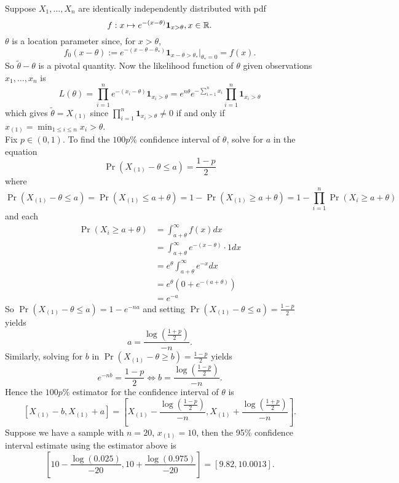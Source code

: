 \documentclass[11pt,fleqn]{book} %
\begin{document}
\begin{example} \label{5711}
Suppose \(X_1, \ldots, X_n\) are identically independently distributed with pdf
\[
f: x\mapsto e^{-(x - \theta)}\mathbf{1}_{x > \theta}, x \in \mathbb{R}.
\]
\indent \(\theta\) is a location parameter since, for \(x > \theta\),
\[
f_0(x - \theta) := e^{-(x - \theta - \theta_*)}\mathbf{1}_{x - \theta > \theta_*}|_{\theta_* = 0} = f(x).
\]
\indent So \(\tilde{\theta} - \theta\) is a pivotal quantity. Now the likelihood function of \(\theta\) given observations \(x_1, \ldots, x_n\) is
\[
L(\theta) = \prod_{i=1}^n e^{-(x_i - \theta)} \mathbf{1}_{x_i > \theta} = e^{n\theta} e^{-\sum_{i=1}^n x_i} \prod_{i=1}^n \mathbf{1}_{x_i > \theta}
\]
which gives \(\tilde{\theta} = X_{(1)}\) since \(\prod_{i=1}^n \mathbf{1}_{x_i > \theta} \neq 0\) if and only if \(x_{(1)} = \min_{1 \leq i \leq n}x_i > \theta\). \\
\indent Fix \(p \in (0, 1)\). To find the \(100p\%\) confidence interval of \(\theta\), solve for \(a\) in the equation
\[
\Pr(X_{(1)} - \theta \leq a) = \frac{1 - p}{2}
\]
where
\[
\Pr(X_{(1)} - \theta \leq a) = \Pr(X_{(1)} \leq a + \theta) = 1 - \Pr(X_{(1)} \geq a + \theta) = 1 - \prod_{i=1}^n \Pr(X_i \geq a + \theta)
\]
and each
\[
\begin{aligned}
\Pr(X_i \geq a + \theta) &= \int_{a + \theta}^\infty f(x)dx \\
&= \int_{a + \theta}^\infty e^{-(x - \theta)}\cdot1 dx \\
&= e^\theta \int_{a + \theta}^\infty e^{-x}dx \\
&= e^\theta(0 + e^{-(a + \theta)}) \\
&= e^{-a}
\end{aligned}
\]
\indent So \(\Pr(X_{(1)} - \theta \leq a) = 1 - e^{-na}\) and setting \(\Pr(X_{(1)} - \theta \leq a) = \frac{1 - p}{2}\) yields
\[
a = \frac{\log\left(\frac{1 + p}{2}\right)}{-n}.
\]
\indent Similarly, solving for \(b\) in \(\Pr(X_{(1)} - \theta \geq b) = \frac{1 - p}{2}\) yields
\[
e^{-nb} = \frac{1 - p}{2} \Leftrightarrow b = \frac{\log\left(\frac{1 - p}{2}\right)}{-n}.
\]
\indent Hence the \(100p\%\) estimator for the confidence interval of \(\theta\) is
\[
\left[X_{(1)} - b, X_{(1)} + a\right] = \left[X_{(1)} - \frac{\log\left(\frac{1 - p}{2}\right)}{-n}, X_{(1)} + \frac{\log\left(\frac{1 + p}{2}\right)}{-n}\right].
\]
\indent Suppose we have a sample with \(n = 20\), \(x_{(1)} = 10\), then the 95\% confidence interval estimate using the estimator above is
\[
\left[10 - \frac{\log(0.025)}{-20}, 10 + \frac{\log(0.975)}{-20}\right] = [9.82, 10.0013].
\]
\end{example}
\end{document}
